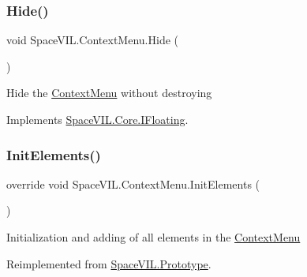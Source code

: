 \subsubsection{\texorpdfstring{Hide()}{Hide()}}
{\footnotesize\ttfamily void Space\+V\+I\+L.\+Context\+Menu.\+Hide (\begin{DoxyParamCaption}{ }\end{DoxyParamCaption})}



Hide the \mbox{\hyperlink{class_space_v_i_l_1_1_context_menu}{Context\+Menu}} without destroying 



Implements \mbox{\hyperlink{interface_space_v_i_l_1_1_core_1_1_i_floating}{Space\+V\+I\+L.\+Core.\+I\+Floating}}.

\mbox{\label{class_space_v_i_l_1_1_context_menu_ad29ab07bf8241bc770aecd96801a37d8}} 
\subsubsection{\texorpdfstring{Init\+Elements()}{InitElements()}}
{\footnotesize\ttfamily override void Space\+V\+I\+L.\+Context\+Menu.\+Init\+Elements (\begin{DoxyParamCaption}{ }\end{DoxyParamCaption})\hspace{0.3cm}{\ttfamily [virtual]}}



Initialization and adding of all elements in the \mbox{\hyperlink{class_space_v_i_l_1_1_context_menu}{Context\+Menu}} 



Reimplemented from \mbox{\hyperlink{class_space_v_i_l_1_1_prototype_ac3379fe02923ee155b5b0084abf27420}{Space\+V\+I\+L.\+Prototype}}.

\mbox{\label{class_space_v_i_l_1_1_context_menu_ab679391d913d15a6341e9ccb0f3b4bf9}} 
